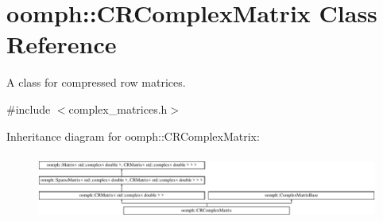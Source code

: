 \hypertarget{classoomph_1_1CRComplexMatrix}{}\section{oomph\+:\+:C\+R\+Complex\+Matrix Class Reference}
\label{classoomph_1_1CRComplexMatrix}


A class for compressed row matrices.  




{\ttfamily \#include $<$complex\+\_\+matrices.\+h$>$}

Inheritance diagram for oomph\+:\+:C\+R\+Complex\+Matrix\+:\begin{figure}[H]
\begin{center}
\leavevmode
\includegraphics[height=2.209073cm]{classoomph_1_1CRComplexMatrix}
\end{center}
\end{figure}
